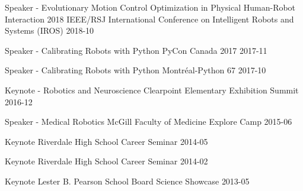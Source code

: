 \begin{cvhonors}

\cvhonor
{Speaker - Evolutionary Motion Control Optimization in Physical Human-Robot Interaction}
{2018 IEEE/RSJ International Conference on Intelligent Robots and Systems (IROS)}
{}
{2018-10}

\cvhonor
{Speaker - Calibrating Robots with Python}
{PyCon Canada 2017}
{}
{2017-11}

\cvhonor
{Speaker - Calibrating Robots with Python}
{Montréal-Python 67}
{}
{2017-10}

\cvhonor
{Keynote - Robotics and Neuroscience}
{Clearpoint Elementary Exhibition Summit}
{}
{2016-12}

\cvhonor
{Speaker - Medical Robotics}
{McGill Faculty of Medicine Explore Camp}
{}
{2015-06}

\cvhonor
{Keynote}
{Riverdale High School Career Seminar}
{}
{2014-05}

\cvhonor
{Keynote}
{Riverdale High School Career Seminar}
{}
{2014-02}

\cvhonor
{Keynote}
{Lester B. Pearson School Board Science Showcase}
{}
{2013-05}

\end{cvhonors}
